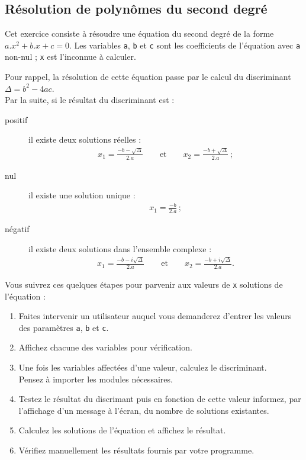 
\subsection{Résolution de polynômes du second degré}

Cet exercice  consiste à résoudre une  équation du second degré  de la
forme  $a.x^2+b.x+c =  0$.   Les variables  \texttt{a}, \texttt{b}  et
\texttt{c}  sont  les  coefficients   de  l'équation  avec  \texttt{a}
non-nul ; \texttt{x} est l'inconnue à calculer.

Pour rappel,  la résolution de cette  équation passe par le  calcul du
discriminant $\Delta =  b^2-4ac$.\\ Par la suite, si  le résultat du
discriminant est :
\begin{description}
\item[positif] il existe deux solutions réelles :
\begin{eqnarray*}
  x_1   =  \frac{-b-\sqrt{\Delta}}{2.a}   \qquad  \textrm{et}   \qquad
  x_2=\frac{-b+\sqrt{\Delta}}{2.a}\,;
\end{eqnarray*}
\item[nul] il existe une solution unique :
\begin{eqnarray*}
  x_1 = \frac{-b}{2.a}\,;
\end{eqnarray*}
\item[négatif] il existe deux solutions dans l'ensemble complexe :
\begin{eqnarray*}
  x_1  =   \frac{-b-i\sqrt{\Delta}}{2.a}  \qquad   \textrm{et}  \qquad
  x_2=\frac{-b+i\sqrt{\Delta}}{2.a}.
\end{eqnarray*}
\end{description}

Vous  suivrez  ces quelques  étapes  pour  parvenir aux  valeurs  de
\texttt{x} solutions de l'équation :


\begin{enumerate}

\item Faites intervenir un utilisateur auquel vous demanderez d'entrer
  les valeurs des paramètres \texttt{a}, \texttt{b} et \texttt{c}.
\item Affichez chacune des variables pour vérification.
\item  Une fois  les  variables affectées  d'une  valeur, calculez  le
  discriminant.\\ Pensez à importer les modules nécessaires.
\item  Testez le  résultat du  discrimant  puis en  fonction de  cette
  valeur informez, par l'affichage d'un  message à l'écran, du nombre
  de solutions existantes.
\item Calculez  les solutions de l'équation et affichez  le résultat.
\item Vérifiez manuellement les résultats fournis par votre programme.

\end{enumerate}
